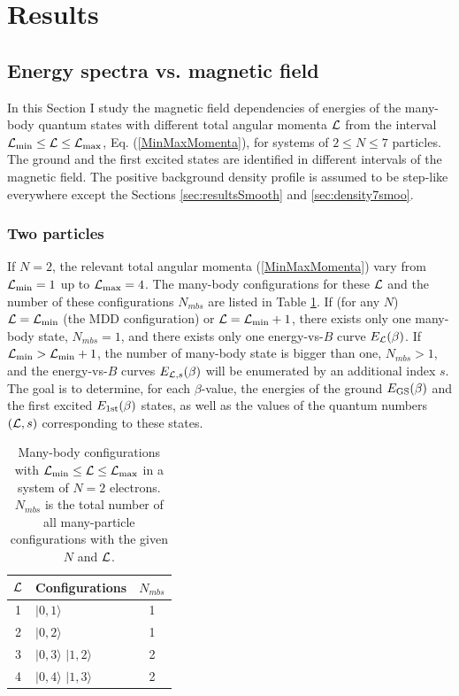 \documentclass[aps,prb,10pt%
]{revtex4-2}
\begin{document}
\section{Results\label{sec:results}}

\subsection{Energy spectra vs. magnetic field\label{sec:ResSpectra}}

In this Section I study the magnetic field dependencies of energies of the many-body quantum states with different total angular momenta ${\cal L}$ from the interval ${\cal L}_{\min}\le {\cal L}\le {\cal L}_{\max}$, Eq. (\ref{MinMaxMomenta}), for systems of $2\le N\le 7$ particles. The ground and the first excited states are identified in different intervals of the magnetic field. The positive background density profile is assumed to be step-like everywhere except the Sections \ref{sec:resultsSmooth} and \ref{sec:density7smoo}. 

\subsubsection{Two particles}

If $N=2$, the relevant total angular momenta (\ref{MinMaxMomenta}) vary from ${\cal L}_{\min}=1$ up to ${\cal L}_{\max}=4$. The many-body configurations for these ${\cal L}$ and the number of these configurations $N_{mbs}$ are listed in Table \ref{tab:N2configs}. If (for any $N$) ${\cal L}={\cal L}_{\min}$ (the MDD configuration) or ${\cal L}={\cal L}_{\min}+1$, there exists only one many-body state, $N_{mbs}=1$, and there exists only one energy-vs-$B$ curve $E_{\cal L}(\beta)$. If ${\cal L}_{\min}>{\cal L}_{\min}+1$, the number of many-body state is bigger than one, $N_{mbs}>1$, and the energy-vs-$B$ curves $E_{{\cal L},s}(\beta)$ will be enumerated by an additional index $s$. The goal is to determine, for each $\beta$-value, the energies of the ground $E_{\rm GS}(\beta)$ and the first excited $E_{\rm 1st}(\beta)$ states, as well as the values of the quantum numbers $({\cal L},s)$ corresponding to these states.

\begin{table}[!ht]
\caption{Many-body configurations with ${\cal L}_{\min}\le {\cal L}\le {\cal L}_{\max}$ in a system of $N=2$ electrons. $N_{mbs}$ is the total number of all many-particle configurations with the given $N$ and ${\cal L}$. \label{tab:N2configs}}
\begin{tabular}{clc}
${\cal L}$ & Configurations  & $N_{mbs}$\\
\hline
1 & \hspace{3mm} $|0,1\rangle $ & 1 \\
2 & \hspace{3mm} $|0,2\rangle $ & 1 \\
3 & \hspace{3mm} $|0,3\rangle $ $|1,2\rangle $ & 2 \\
4 & \hspace{3mm} $|0,4\rangle $ $|1,3\rangle $ & 2 \\
\end{tabular}
\end{table}
\end{document}
